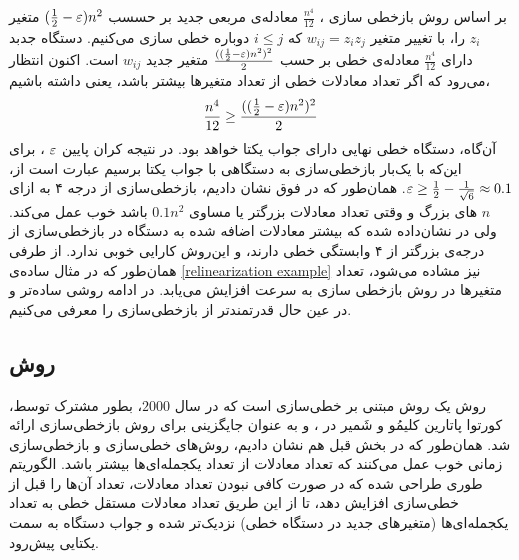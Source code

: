 بر اساس روش بازخطی سازی ، 
$\frac{n^{4}}{12}$
معادله‌ی مربعی جدید بر حسسب 
$(\frac{1}{2} - \varepsilon)n^{2}$
متغیر 
$z_{i}$
را،  با تغییر متغیر 
$w_{ij} = z_{i}z_{j}$ 
که 
$i\leq j$
دوباره خطی سازی می‌کنیم. دستگاه جدبد دارای 
$\frac{n^{4}}{12}$
معادله‌ی خطی بر حسب 
$\frac{((\frac{1}{2} - \varepsilon)n^{2})^{2}}{2}$
متغیر جدید 
$w_{ij}$
است. اکنون انتظار می‌رود که اگر تعداد معادلات خطی از تعداد متغیرها بیشتر باشد، یعنی داشته باشیم، 
$$\frac{n^{4}}{12}\geq \frac{((\frac{1}{2} - \varepsilon)n^{2})^{2}}{2}$$
آن‌گاه، دستگاه خطی نهایی دارای جواب یکتا خواهد بود. در نتیجه کران پایین 
$\varepsilon$
، برای این‌که با یک‌بار بازخطی‌سازی به دستگاهی با جواب یکتا برسیم عبارت‌ است از، 
$\varepsilon \geq \frac{1}{2} - \frac{1}{\sqrt{6}}\approx 0.1$.
همان‌طور که در فوق نشان دادیم، بازخطی‌سازی از درجه‌ ۴ به ازای 
$n$
های بزرگ و وقتی تعداد معادلات بزرگتر یا مساوی 
$0.1 n^{2}$
باشد خوب عمل می‌کند. ولی در 
\cite{courtois2000efficient}
نشان‌داده شده که  بیشتر معادلات اضافه شده به دستگاه در بازخطی‌سازی از درجه‌ی بزرگتر از ۴ وابستگی خطی  دارند، و این‌روش  کارایی خوبی ندارد. از طرفی همان‌طور که در مثال ساده‌ی 
\ref{relinearization example}
نیز مشاده می‌شود، تعداد متغیرها در روش بازخطی سازی به سرعت افزایش می‌یابد. در ادامه روشی ساده‌تر و در عین حال قدرتمند‌تر از بازخطی‌سازی را معرفی می‌کنیم.

\subsection{روش 	}
روش 
یک روش مبتنی بر خطی‌سازی است که در سال 
$2000$،
 بطور مشترک توسط، کورتوا 
پاتارین 
کلیمُو 
و
شَمیر در 
\cite{courtois2000efficient}،
 و به عنوان جایگزینی برای روش بازخطی‌سازی ارائه شد. همان‌طور که در بخش قبل هم نشان دادیم، روش‌‌های خطی‌سازی و بازخطی‌سازی زمانی خوب عمل می‌کنند که تعداد معادلات از تعداد یکجمله‌ای‌ها بیشتر باشد. الگوریتم 
طوری طراحی شده که در صورت کافی نبودن تعداد معادلات، تعداد آن‌ها را قبل از خطی‌سازی افزایش دهد، تا از این طریق تعداد معادلات مستقل خطی به تعداد یکجمله‌ای‌ها (متغیرهای جدید در دستگاه خطی) نزدیک‌تر شده و جواب دستگاه به سمت یکتایی پیش‌رود. 

